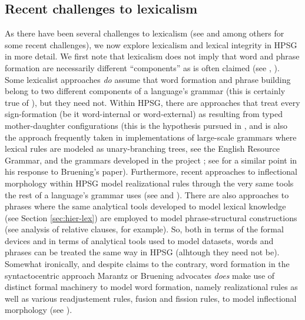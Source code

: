 \documentclass[output=paper]{langsci/langscibook}
\begin{document}
\subsection{Recent challenges to lexicalism}

As there have been several challenges to lexicalism (see \citet{Bruening2018} and  \citet{Haspelmath2011} among others for some recent challenges), we now explore lexicalism and  lexical integrity in HPSG in more detail. We first note that lexicalism does not imply that word and phrase formation are necessarily different ``components'' as is often claimed (see \citet{Marantz1997}, \citealt{Bruening2018}). Some lexicalist approaches \emph{do} assume that word formation and phrase building belong to two different components of a language's grammar (this is certainly true of \citealt{Jackendoff1975}), but they need not. Within HPSG, there are approaches that treat every sign-formation (be it word-internal or word-external) as resulting from typed mother-daughter configurations (this is the hypothesis pursued in , and is also the approach frequently taken in implementations of large-scale grammars where lexical rules are modeled as unary-branching trees, see the English Resource Grammar, \citet{Copestake2002} and the grammars developed in the  project \citet{Mueller2015}; see \citet[e58]{Mueller2018} for a similar point in his response to Bruening's paper). Furthermore, recent approaches to inflectional morphology within HPSG model realizational rules through the very same tools the rest of a language's grammar uses (see \citet{CrysmannandBonami2016} and ).  There are also approaches to phrases where the same analytical tools developed to model lexical knowledge (see Section \ref{sec:hier-lex}) are employed to model phrase-structural constructions (see  analysis of relative clauses, for example). So, both in terms of the formal devices and in terms of analytical tools used to model datasets, words and phrases can be treated the same way in HPSG (alhtough they need not be). Somewhat ironically, and despite claims to the contrary, word formation in the syntactocentric approach Marantz or Bruening advocates \emph{does} make use of distinct formal machinery to model word formation, namely realizational rules as well as various readjustement rules, fusion and fission rules, to model inflectional morphology (see \citealt{HalleandMarantz1993,Embick2015}).
\end{document}
